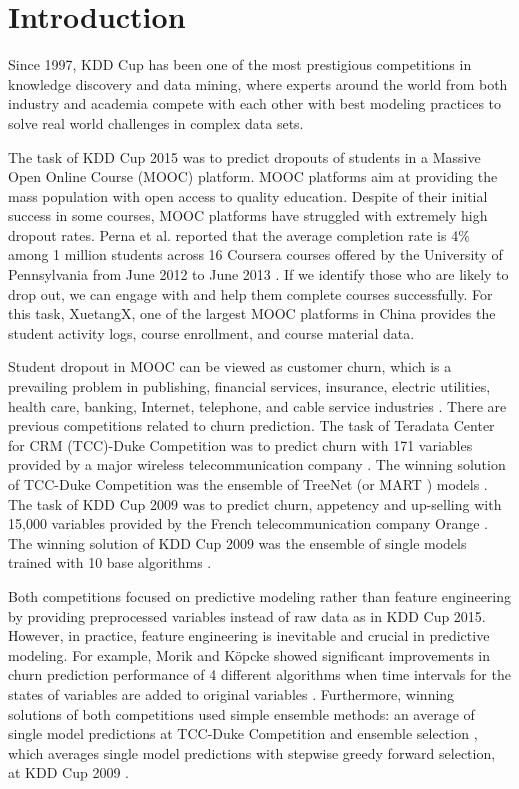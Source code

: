 \section{Introduction}
Since 1997, KDD Cup has been one of the most prestigious competitions in knowledge discovery and data mining, where experts around the world from both industry and academia compete with each other with best modeling practices to solve real world challenges in complex data sets.

The task of KDD Cup 2015 was to predict dropouts of students in a Massive Open Online Course (MOOC) platform.  MOOC platforms aim at providing the mass population with open access to quality education.  Despite of their initial success in some courses, MOOC platforms have struggled with extremely high dropout rates. Perna et al. reported that the average completion rate is 4\% among 1 million students across 16 Coursera courses offered by the University of Pennsylvania from June 2012 to June 2013 \cite{perna2013life}.  If we identify those who are likely to drop out, we can engage with and help them complete courses successfully.  For this task, XuetangX, one of the largest MOOC platforms in China provides the student activity logs, course enrollment, and course material data.

Student dropout in MOOC can be viewed as customer churn, which is a prevailing problem in publishing, financial services, insurance, electric utilities, health care, banking, Internet, telephone, and cable service industries \cite{neslin2006defection}.  There are previous competitions related to churn prediction.  The task of Teradata Center for CRM (TCC)-Duke Competition was to predict churn with 171 variables provided by a major wireless telecommunication company \cite{neslin2006defection}. The winning solution of TCC-Duke Competition was the ensemble of TreeNet (or MART \cite{friedman2003multiple}) models \cite{tcc_duke_competition}.  The task of KDD Cup 2009 was to predict churn, appetency and up-selling with 15,000 variables provided by the French telecommunication company Orange \cite{guyon2009analysis}.  The winning solution of KDD Cup 2009 was the ensemble of single models trained with 10 base algorithms \cite{niculescu2009winning}.  

Both competitions focused on predictive modeling rather than feature engineering by providing preprocessed variables instead of raw data as in KDD Cup 2015. However, in practice, feature engineering is inevitable and crucial in predictive modeling.  For example, Morik and K{\"o}pcke showed significant improvements in churn prediction performance of 4 different algorithms when time intervals for the states of variables are added to original variables \cite{morik2004analysing}.  Furthermore, winning solutions of both competitions used simple ensemble methods:  an average of single model predictions at TCC-Duke Competition \cite{tcc_duke_competition} and ensemble selection \cite{caruana2004ensemble}, which averages single model predictions with stepwise greedy forward selection, at KDD Cup 2009 \cite{niculescu2009winning}.

